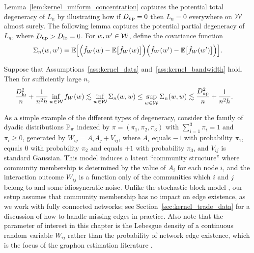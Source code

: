 Lemma~\ref{lem:kernel_uniform_concentration} captures the potential total
degeneracy
of $L_n$ by illustrating how if $\Du=0$ then $L_n=0$ everywhere on $\cW$ almost
surely. The following lemma captures the potential partial degeneracy of $L_n$,
where $\Du > \Dl = 0$. For $w,w' \in \cW$, define the covariance function
%
\begin{align*}
  \Sigma_n(w,w') =
  \E\Big[
    \Big(
      \hat f_W(w)
      - \E\big[\hat f_W(w)\big]
    \Big)
    \Big(
      \hat f_W(w')
      - \E\big[\hat f_W(w')\big]
    \Big)
  \Big].
\end{align*}
%
\begin{lemma}
  \label{lem:kernel_variance_bounds}
  Suppose that Assumptions~\ref{ass:kernel_data} and~\ref{ass:kernel_bandwidth}
  hold. Then for sufficiently large $n$,
  \begin{align*}
    \frac{\Dl^2}{n} + \frac{1}{n^2h}
    \inf_{w \in \cW} f_W(w)
    &\lesssim
    \inf_{w \in \cW} \Sigma_n(w,w)
    \leq
    \sup_{w \in \cW} \Sigma_n(w,w)
    \lesssim
    \frac{\Du^2}{n} + \frac{1}{n^2h}.
  \end{align*}
\end{lemma}

As a simple example of the different types of degeneracy, consider the family
of dyadic distributions $\P_{\pi}$ indexed by $\pi = (\pi_1, \pi_2, \pi_3)$
with $\sum_{i=1}^3 \pi_i = 1$ and $\pi_i \geq 0$, generated by
$W_{i j} = A_i A_j + V_{i j}$, where $A_i$ equals $-1$ with probability
$\pi_1$, equals $0$ with probability $\pi_2$ and equals $+1$ with probability
$\pi_3$, and $V_{i j}$ is standard Gaussian. This model induces a latent
``community structure'' where community membership is determined by the value
of $A_i$ for each node $i$, and the interaction outcome $W_{i j}$ is a function
only of the communities which $i$ and $j$ belong to and some idiosyncratic
noise. Unlike the stochastic block model \citep{kolaczyk2009statistical}, our
setup assumes that community membership has no impact on edge existence, as we
work with fully connected networks; see Section~\ref{sec:kernel_trade_data} for
a
discussion of how to handle missing edges in practice. Also note that the
parameter of interest in this chapter is the Lebesgue density of a continuous
random variable $W_{i j}$ rather than the probability of network edge
existence, which is the focus of the graphon estimation literature
\citep{gao2021minimax}.

